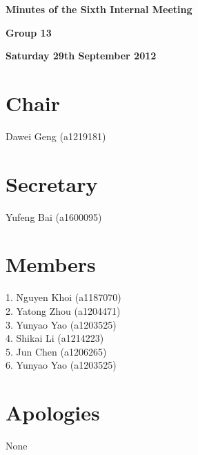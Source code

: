\documentclass[11pt, a4paper]{article}
\begin{document}
 



\vspace*{15pt}

\begin{center}
\huge \bf Minutes of the Sixth Internal Meeting
\end{center}


\begin{center}
\Large \bf Group 13
\end{center}

\begin{center}
\Large \bf  Saturday 29th September 2012
\end{center}

\section*{Chair}
 Dawei Geng (a1219181)

\section*{Secretary}
Yufeng Bai (a1600095)

\section*{Members}
1. Nguyen Khoi (a1187070)\\
2. Yatong Zhou (a1204471)\\
3. Yunyao Yao (a1203525)\\
4. Shikai Li (a1214223)\\
5. Jun Chen (a1206265)\\
6. Yunyao Yao (a1203525)
\vspace*{10pt}

\section*{Apologies}
None
\end{document}
